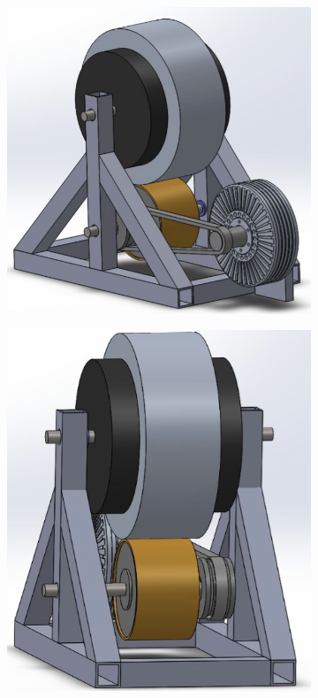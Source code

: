 \documentclass[main.tex]{subfiles}
\begin{document}
    \begin{figure}
           \centering
   \begin{subfigure}{0.4\textwidth}
       \includegraphics[width=\linewidth]{images/testrig1}
       \caption{}
       \label{fig:testrig1}
       \end{subfigure}        
       \begin{subfigure}{0.4\textwidth}
       \includegraphics[width=\linewidth]{images/testrig2}

\end{subfigure}
\end{figure}
\end{document}
